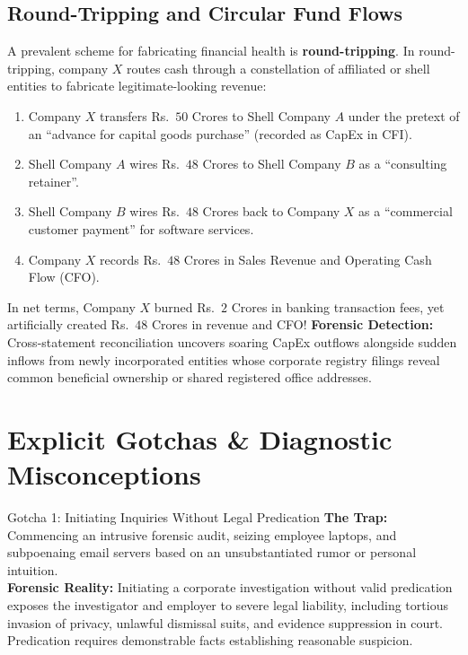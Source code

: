\subsection{Round-Tripping and Circular Fund Flows}
A prevalent scheme for fabricating financial health is \textbf{round-tripping}. In round-tripping, company $X$ routes cash through a constellation of affiliated or shell entities to fabricate legitimate-looking revenue:
\begin{enumerate}
    \item Company $X$ transfers Rs.~$50$ Crores to Shell Company $A$ under the pretext of an ``advance for capital goods purchase'' (recorded as CapEx in CFI).
    \item Shell Company $A$ wires Rs.~$48$ Crores to Shell Company $B$ as a ``consulting retainer''.
    \item Shell Company $B$ wires Rs.~$48$ Crores back to Company $X$ as a ``commercial customer payment'' for software services.
    \item Company $X$ records Rs.~$48$ Crores in Sales Revenue and Operating Cash Flow (CFO).
\end{enumerate}
In net terms, Company $X$ burned Rs.~$2$ Crores in banking transaction fees, yet artificially created Rs.~$48$ Crores in revenue and CFO! 
\textbf{Forensic Detection:} Cross-statement reconciliation uncovers soaring CapEx outflows alongside sudden inflows from newly incorporated entities whose corporate registry filings reveal common beneficial ownership or shared registered office addresses.

\section{Explicit Gotchas \& Diagnostic Misconceptions}

\begin{trapbox}{Gotcha 1: Initiating Inquiries Without Legal Predication}
\textbf{The Trap:} Commencing an intrusive forensic audit, seizing employee laptops, and subpoenaing email servers based on an unsubstantiated rumor or personal intuition.\\
\textbf{Forensic Reality:} Initiating a corporate investigation without valid predication exposes the investigator and employer to severe legal liability, including tortious invasion of privacy, unlawful dismissal suits, and evidence suppression in court. Predication requires demonstrable facts establishing reasonable suspicion.
\end{trapbox}

